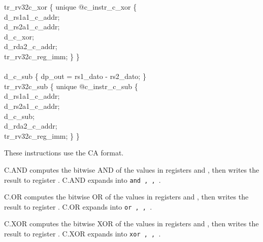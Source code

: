 {\indent tr\_rv32c\_xor \{ unique @c\_instr\_c\_xor \{ \\%
\indent \hspace{\parindent} d\_rs1a1\_c\_addr; \\%
\indent \hspace{\parindent} d\_rs2a1\_c\_addr; \\%
\indent \hspace{\parindent} d\_c\_xor; \\%
\indent \hspace{\parindent} d\_rda2\_c\_addr;\\%
\indent \hspace{\parindent} tr\_rv32c\_reg\_imm; \} \} \\%
\\
\indent d\_c\_sub \{ dp\_out = rs1\_dato - rs2\_dato; \}\\%
\indent tr\_rv32c\_sub \{ unique @c\_instr\_c\_sub \{ \\%
\indent \hspace{\parindent} d\_rs1a1\_c\_addr; \\%
\indent \hspace{\parindent} d\_rs2a1\_c\_addr; \\%
\indent \hspace{\parindent} d\_c\_sub; \\%
\indent \hspace{\parindent} d\_rda2\_c\_addr; \\%
\indent \hspace{\parindent} tr\_rv32c\_reg\_imm; \} \} \\%
}

These instructions use the CA format.

C.AND computes the bitwise AND of the values in registers {\em \rdprime}
and {\em \rstwoprime}, then writes the result to register {\em \rdprime}.
C.AND expands into {\tt and \rdprime, \rdprime, \rstwoprime}.

C.OR computes the bitwise OR of the values in registers {\em \rdprime}
and {\em \rstwoprime}, then writes the result to register {\em \rdprime}.
C.OR expands into {\tt or \rdprime, \rdprime, \rstwoprime}.

C.XOR computes the bitwise XOR of the values in registers {\em \rdprime}
and {\em \rstwoprime}, then writes the result to register {\em \rdprime}.
C.XOR expands into {\tt xor \rdprime, \rdprime, \rstwoprime}.

